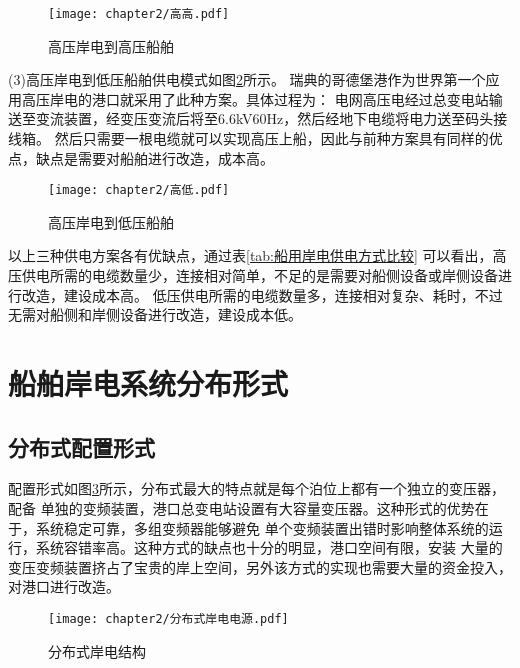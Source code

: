 \begin{figure}[!htp]
	\centering
	\texttt{[image: chapter2/高高.pdf]}
	\caption{高压岸电到高压船舶}
	\label{fig:高高}
\end{figure}

(3)高压岸电到低压船舶供电模式如图\ref{fig:高低}所示。
瑞典的哥德堡港作为世界第一个应用高压岸电的港口就采用了此种方案。具体过程为：
电网高压电经过总变电站输送至变流装置，经变压变流后将至6.6kV60Hz，然后经地下电缆将电力送至码头接线箱。
然后只需要一根电缆就可以实现高压上船，因此与前种方案具有同样的优点，缺点是需要对船舶进行改造，成本高。

\begin{figure}[!htp]
	\centering
	\texttt{[image: chapter2/高低.pdf]}
	\caption{高压岸电到低压船舶}
	\label{fig:高低}
\end{figure}

以上三种供电方案各有优缺点，通过表\ref{tab:船用岸电供电方式比较}
可以看出，高压供电所需的电缆数量少，连接相对简单，不足的是需要对船侧设备或岸侧设备进行改造，建设成本高。
低压供电所需的电缆数量多，连接相对复杂、耗时，不过无需对船侧和岸侧设备进行改造，建设成本低。

\begin{table}[!htp]
	\centering
	\caption[船用岸电供电方式比较]{船用岸电供电方式比较}
	\label{tab:船用岸电供电方式比较}
\end{table}

\section{船舶岸电系统分布形式}

\subsection{分布式配置形式}

配置形式如图\ref{fig:分布式岸电结构}所示，分布式最大的特点就是每个泊位上都有一个独立的变压器，配备
单独的变频装置，港口总变电站设置有大容量变压器。这种形式的优势在于，系统稳定可靠，多组变频器能够避免
单个变频装置出错时影响整体系统的运行，系统容错率高。这种方式的缺点也十分的明显，港口空间有限，安装
大量的变压变频装置挤占了宝贵的岸上空间，另外该方式的实现也需要大量的资金投入，对港口进行改造。

\begin{figure}[!htp]
	\centering
	\texttt{[image: chapter2/分布式岸电电源.pdf]}
	\caption{分布式岸电结构}
	\label{fig:分布式岸电结构}
\end{figure}

